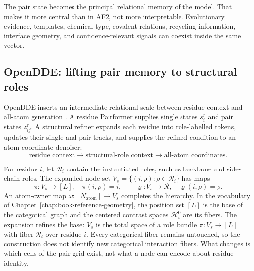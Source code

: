 The pair state becomes the principal relational memory of the model.  That makes it more central
than in AF2, not more interpretable.  Evolutionary evidence, templates, chemical type, covalent
relations, recycling information, interface geometry, and confidence-relevant signals can coexist
inside the same vector.

\subsection{OpenDDE: lifting pair memory to structural roles}

OpenDDE inserts an intermediate relational scale between residue context and all-atom generation
\cite{opendde2026}.  A residue Pairformer supplies single states $s_i^r$ and pair states
$z_{ij}^r$.  A structural refiner expands each residue into role-labelled tokens, updates their
single and pair tracks, and supplies the refined condition to an atom-coordinate denoiser:
\begin{equation}
\text{residue context}\longrightarrow\text{structural-role context}
\longrightarrow\text{all-atom coordinates}.
\label{eq:book-opendde-resolution-chain}
\end{equation}

For residue $i$, let $\mathcal R_i$ contain the instantiated roles, such as backbone and
side-chain roles.  The expanded node set $V_s=\{(i,\rho):\rho\in\mathcal R_i\}$ has maps
\begin{equation}
\pi:V_s\to[L],\quad \pi(i,\rho)=i,
\qquad
\varrho:V_s\to\mathcal R,\quad\varrho(i,\rho)=\rho.
\label{eq:book-opendde-parent-map}
\end{equation}
An atom-owner map $\omega:[N_{\mathrm{atom}}]\to V_s$ completes the hierarchy.  In the vocabulary
of Chapter~\ref{chap:book-reference-geometry}, the position set $[L]$ is the base of the
categorical graph and the centered contrast spaces $\mathcal H_i^0$ are its fibers.  The
expansion refines the base: $V_s$ is the total space of a role bundle $\pi:V_s\to[L]$ with fiber
$\mathcal R_i$ over residue $i$.  Every categorical fiber remains untouched, so the construction
does not identify new categorical interaction fibers.  What changes is which cells of the pair
grid exist, not what a node can encode about residue identity.

